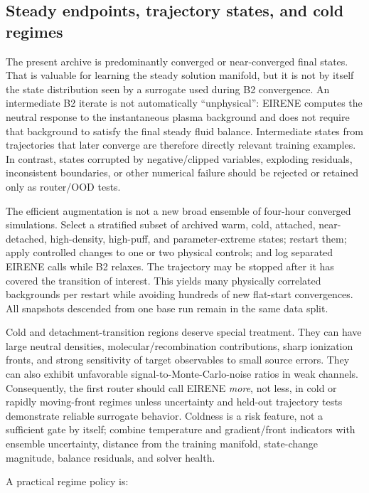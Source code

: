 \documentclass[11pt]{article}
\begin{document}
\subsection{Steady endpoints, trajectory states, and cold regimes}

The present archive is predominantly converged or near-converged final states. That is valuable for learning the steady solution manifold, but it is not by itself the state distribution seen by a surrogate used during B2 convergence. An intermediate B2 iterate is not automatically ``unphysical'': EIRENE computes the neutral response to the instantaneous plasma background and does not require that background to satisfy the final steady fluid balance. Intermediate states from trajectories that later converge are therefore directly relevant training examples. In contrast, states corrupted by negative/clipped variables, exploding residuals, inconsistent boundaries, or other numerical failure should be rejected or retained only as router/OOD tests.

The efficient augmentation is not a new broad ensemble of four-hour converged simulations. Select a stratified subset of archived warm, cold, attached, near-detached, high-density, high-puff, and parameter-extreme states; restart them; apply controlled changes to one or two physical controls; and log separated EIRENE calls while B2 relaxes. The trajectory may be stopped after it has covered the transition of interest. This yields many physically correlated backgrounds per restart while avoiding hundreds of new flat-start convergences. All snapshots descended from one base run remain in the same data split.

Cold and detachment-transition regions deserve special treatment. They can have large neutral densities, molecular/recombination contributions, sharp ionization fronts, and strong sensitivity of target observables to small source errors. They can also exhibit unfavorable signal-to-Monte-Carlo-noise ratios in weak channels. Consequently, the first router should call EIRENE \emph{more}, not less, in cold or rapidly moving-front regimes unless uncertainty and held-out trajectory tests demonstrate reliable surrogate behavior. Coldness is a risk feature, not a sufficient gate by itself; combine temperature and gradient/front indicators with ensemble uncertainty, distance from the training manifold, state-change magnitude, balance residuals, and solver health.

A practical regime policy is:
\end{document}
